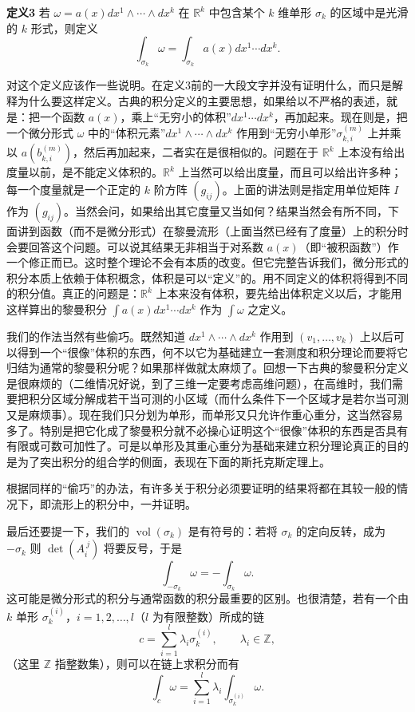 \noindent\textbf{定义3}\quad
若 $\omega=a(x)dx^1\wedge\cdots\wedge dx^k$ 在 $\mathbb R^k$ 中包含某个 $k$ 维单形 $\sigma_k$ 的区域中是光滑的 $k$ 形式，则定义
\begin{equation}
 \int_{\sigma_k}\omega=\int_{\sigma_k}a(x)dx^1\cdots dx^k.
 \tag{12}
\end{equation}

对这个定义应该作一些说明。在定义3前的一大段文字并没有证明什么，而只是解释为什么要这样定义。古典的积分定义的主要思想，如果给以不严格的表述，就是：把一个函数 $a(x)$，乘上“无穷小的体积”$dx^1\cdots dx^k$，再加起来。现在则是，把一个微分形式 $\omega$ 中的“体积元素”$dx^1\wedge\cdots\wedge dx^k$ 作用到“无穷小单形”$\sigma_{k,i}^{(m)}$ 上并乘以 $a(b_{k,i}^{(m)})$，然后再加起来，二者实在是很相似的。问题在于 $\mathbb R^k$ 上本没有给出度量以前，是不能定义体积的。$\mathbb R^k$ 上当然可以给出度量，而且可以给出许多种；每一个度量就是一个正定的 $k$ 阶方阵 $(g_{ij})$。上面的讲法则是指定用单位矩阵 $I$ 作为 $(g_{ij})$。当然会问，如果给出其它度量又当如何？结果当然会有所不同，下面讲到函数（而不是微分形式）在黎曼流形（上面当然已经有了度量）上的积分时会要回答这个问题。可以说其结果无非相当于对系数 $a(x)$（即“被积函数”）作一个修正而已。这时整个理论不会有本质的改变。但它完整告诉我们，微分形式的积分本质上依赖于体积概念，体积是可以“定义”的。用不同定义的体积将得到不同的积分值。真正的问题是：$\mathbb R^k$ 上本来没有体积，要先给出体积定义以后，才能用这样算出的黎曼积分 $\int a(x)dx^1\cdots dx^k$ 作为 $\int\omega$ 之定义。

我们的作法当然有些偷巧。既然知道 $dx^1\wedge\cdots\wedge dx^k$ 作用到 $(v_1,\ldots,v_k)$ 上以后可以得到一个“很像”体积的东西，何不以它为基础建立一套测度和积分理论而要将它归结为通常的黎曼积分呢？如果那样做就太麻烦了。回想一下古典的黎曼积分定义是很麻烦的（二维情况好说，到了三维一定要考虑高维问题），在高维时，我们需要把积分区域分解成若干当可测的小区域（而什么条件下一个区域才是若尔当可测又是麻烦事）。现在我们只分划为单形，而单形又只允许作重心重分，这当然容易多了。特别是把它化成了黎曼积分就不必操心证明这个“很像”体积的东西是否具有有限或可数可加性了。可是以单形及其重心重分为基础来建立积分理论真正的目的是为了突出积分的组合学的侧面，表现在下面的斯托克斯定理上。

根据同样的“偷巧”的办法，有许多关于积分必须要证明的结果将都在其较一般的情况下，即流形上的积分中，一并证明。

最后还要提一下，我们的 $\operatorname{vol}(\sigma_k)$ 是有符号的：若将 $\sigma_k$ 的定向反转，成为 $-\sigma_k$ 则 $\det(A_i^{\ j})$ 将要反号，于是
\begin{equation}
 \int_{-\sigma_k}\omega=-\int_{\sigma_k}\omega.
 \tag{13}
\end{equation}
这可能是微分形式的积分与通常函数的积分最重要的区别。也很清楚，若有一个由 $k$ 单形 $\sigma_k^{(i)}$，$i=1,2,\ldots,l$（$l$ 为有限整数）所成的链
\begin{equation}
 c=\sum_{i=1}^l\lambda_i\sigma_k^{(i)},\qquad \lambda_i\in\mathbb Z,
 \tag{14}
\end{equation}
（这里 $\mathbb Z$ 指整数集），则可以在链上求积分而有
\begin{equation}
 \int_c\omega=\sum_{i=1}^l\lambda_i\int_{\sigma_k^{(i)}}\omega.
 \tag{15}
\end{equation}

